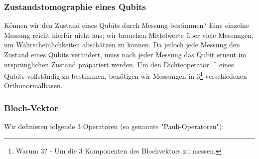 \subsubsection*{Zustandstomographie eines Qubits}
Können wir den Zustand eines Qubits durch Messung bestimmen? Eine einzelne Messung reicht hierfür nicht aus; wir brauchen Mittelwerte über viele Messungen, um Wahrscheinlichkeiten abschätzen zu können. Da jedoch jede Messung den Zustand eines Qubits verändert, muss nach jeder Messung das Qubit erneut im ursprünglichen Zustand präpariert werden. Um den Dichteoperator \f{\varrho=\cket{\psi}\cbra{\psi}} eines Qubits vollständig zu bestimmen, benötigen wir Messungen in 3\footnote{Warum 3? - Um die 3 Komponenten des Blochvektors zu messen.} verschiedenen Orthonormalbasen.

\subsubsection*{Bloch-Vektor}
Wir definieren folgende 3 Operatoren (so genannte "Pauli-Operatoren"):

